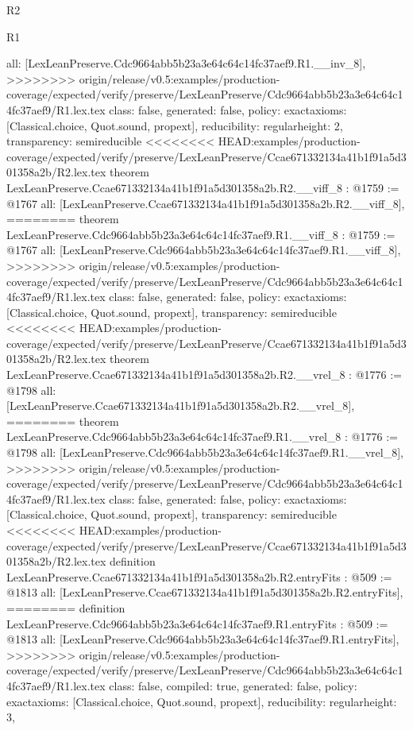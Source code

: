 \begin{lexlean}{R2}
\begin{lexlean}{R1}
\begin{coremodule}
{{{{{{{{{{{{  all: [LexLeanPreserve.Cdc9664abb5b23a3e64c64c14fc37aef9.R1.__inv_8],
>>>>>>>> origin/release/v0.5:examples/production-coverage/expected/verify/preserve/LexLeanPreserve/Cdc9664abb5b23a3e64c64c14fc37aef9/R1.lex.tex
  class: false,
  generated: false,
  policy: exact{axioms: [Classical.choice, Quot.sound, propext]},
  reducibility: regular{height: 2},
  transparency: semireducible
}
<<<<<<<< HEAD:examples/production-coverage/expected/verify/preserve/LexLeanPreserve/Ccae671332134a41b1f91a5d301358a2b/R2.lex.tex
theorem LexLeanPreserve.Ccae671332134a41b1f91a5d301358a2b.R2.__viff_8 : @1759 := @1767 {
  all: [LexLeanPreserve.Ccae671332134a41b1f91a5d301358a2b.R2.__viff_8],
========
theorem LexLeanPreserve.Cdc9664abb5b23a3e64c64c14fc37aef9.R1.__viff_8 : @1759 := @1767 {
  all: [LexLeanPreserve.Cdc9664abb5b23a3e64c64c14fc37aef9.R1.__viff_8],
>>>>>>>> origin/release/v0.5:examples/production-coverage/expected/verify/preserve/LexLeanPreserve/Cdc9664abb5b23a3e64c64c14fc37aef9/R1.lex.tex
  class: false,
  generated: false,
  policy: exact{axioms: [Classical.choice, Quot.sound, propext]},
  transparency: semireducible
}
<<<<<<<< HEAD:examples/production-coverage/expected/verify/preserve/LexLeanPreserve/Ccae671332134a41b1f91a5d301358a2b/R2.lex.tex
theorem LexLeanPreserve.Ccae671332134a41b1f91a5d301358a2b.R2.__vrel_8 : @1776 := @1798 {
  all: [LexLeanPreserve.Ccae671332134a41b1f91a5d301358a2b.R2.__vrel_8],
========
theorem LexLeanPreserve.Cdc9664abb5b23a3e64c64c14fc37aef9.R1.__vrel_8 : @1776 := @1798 {
  all: [LexLeanPreserve.Cdc9664abb5b23a3e64c64c14fc37aef9.R1.__vrel_8],
>>>>>>>> origin/release/v0.5:examples/production-coverage/expected/verify/preserve/LexLeanPreserve/Cdc9664abb5b23a3e64c64c14fc37aef9/R1.lex.tex
  class: false,
  generated: false,
  policy: exact{axioms: [Classical.choice, Quot.sound, propext]},
  transparency: semireducible
}
<<<<<<<< HEAD:examples/production-coverage/expected/verify/preserve/LexLeanPreserve/Ccae671332134a41b1f91a5d301358a2b/R2.lex.tex
definition LexLeanPreserve.Ccae671332134a41b1f91a5d301358a2b.R2.entryFits : @509 := @1813 {
  all: [LexLeanPreserve.Ccae671332134a41b1f91a5d301358a2b.R2.entryFits],
========
definition LexLeanPreserve.Cdc9664abb5b23a3e64c64c14fc37aef9.R1.entryFits : @509 := @1813 {
  all: [LexLeanPreserve.Cdc9664abb5b23a3e64c64c14fc37aef9.R1.entryFits],
>>>>>>>> origin/release/v0.5:examples/production-coverage/expected/verify/preserve/LexLeanPreserve/Cdc9664abb5b23a3e64c64c14fc37aef9/R1.lex.tex
  class: false,
  compiled: true,
  generated: false,
  policy: exact{axioms: [Classical.choice, Quot.sound, propext]},
  reducibility: regular{height: 3},
}}}}}}}}}}}}}}}
\end{coremodule}
\end{lexlean}
\end{lexlean}
